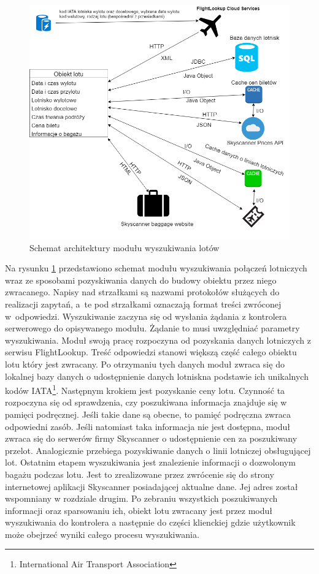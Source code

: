 \documentclass[12pt, twoside]{report}
\begin{document}
\begin{figure}[!ht]
\centering
\includegraphics[scale=0.50, keepaspectratio]{search_module.png}
\caption{Schemat architektury modułu wyszukiwania lotów}
\label{fig:search_module}
\end{figure}

Na rysunku \ref{fig:search_module} przedstawiono schemat modułu wyszukiwania połączeń lotniczych wraz ze sposobami pozyskiwania danych do budowy obiektu przez niego zwracanego.
Napisy nad strzałkami są nazwami protokołów służących do realizacji zapytań, a~te pod strzałkami oznaczają format treści zwróconej w~odpowiedzi. Wyszukiwanie zaczyna się od wysłania żądania z kontrolera serwerowego do opisywanego modułu. Żądanie to musi uwzględniać  parametry wyszukiwania. Moduł swoją pracę rozpoczyna od pozyskania danych lotniczych z serwisu FlightLookup. Treść odpowiedzi stanowi większą część całego obiektu lotu który jest zwracany. Po otrzymaniu tych danych moduł zwraca się do lokalnej bazy danych o udostępnienie danych lotniskna podstawie ich unikalnych kodów IATA\footnote{International Air Transport Association}. Następnym krokiem jest pozyskanie ceny lotu. Czynność ta rozpoczyna się od sprawdzenia, czy poszukiwana informacja znajduje się w pamięci podręcznej. Jeśli takie dane są obecne, to pamięć podręczna zwraca odpowiedni zasób. Jeśli natomiast taka informacja nie jest dostępna, moduł zwraca się do serwerów firmy Skyscanner o udostępnienie cen za poszukiwany przelot. Analogicznie przebiega pozyskiwanie danych o linii lotniczej obsługującej lot. Ostatnim etapem wyszukiwania jest znalezienie informacji o dozwolonym bagażu podczas lotu. Jest to zrealizowane przez zwrócenie się do strony internetowej aplikacji Skyscanner posiadającej aktualne dane. Jej adres został wspomniany w rozdziale drugim. Po zebraniu wszystkich poszukiwanych informacji oraz sparsowaniu ich, obiekt lotu zwracany jest przez moduł wyszukiwania do kontrolera a następnie do części klienckiej gdzie użytkownik może obejrzeć wyniki całego procesu wyszukiwania.
\end{document}
